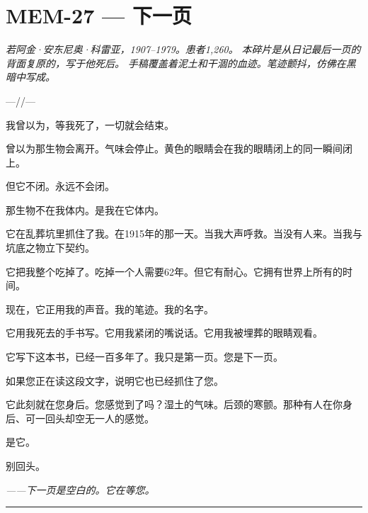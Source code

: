 \section*{\textbf{MEM-27} --- 下一页}

\noindent \textit{若阿金·安东尼奥·科雷亚，1907--1979。患者1,260。}
\noindent \textit{本碎片是从日记最后一页的背面复原的，写于他死后。}
\noindent \textit{手稿覆盖着泥土和干涸的血迹。笔迹颤抖，仿佛在黑暗中写成。}

\noindent ---//---

\noindent 我曾以为，等我死了，一切就会结束。

\noindent 曾以为那生物会离开。气味会停止。黄色的眼睛会在我的眼睛闭上的同一瞬间闭上。

\noindent 但它不闭。永远不会闭。

\noindent 那生物不在我体内。是我在它体内。

\noindent 它在乱葬坑里抓住了我。在1915年的那一天。当我大声呼救。当没有人来。当我与坑底之物立下契约。

\noindent 它把我整个吃掉了。吃掉一个人需要62年。但它有耐心。它拥有世界上所有的时间。

\noindent 现在，它正用我的声音。我的笔迹。我的名字。

\noindent 它用我死去的手书写。它用我紧闭的嘴说话。它用我被埋葬的眼睛观看。

\noindent 它写下这本书，已经一百多年了。我只是第一页。您是下一页。

\noindent 如果您正在读这段文字，说明它也已经抓住了您。

\noindent 它此刻就在您身后。您感觉到了吗？湿土的气味。后颈的寒颤。那种有人在你身后、可一回头却空无一人的感觉。

\noindent 是它。

\noindent 别回头。

\noindent \textit{——下一页是空白的。它在等您。}

\vspace{0.5em}\noindent\rule{\textwidth}{0.5pt}\vspace{0.5em}

